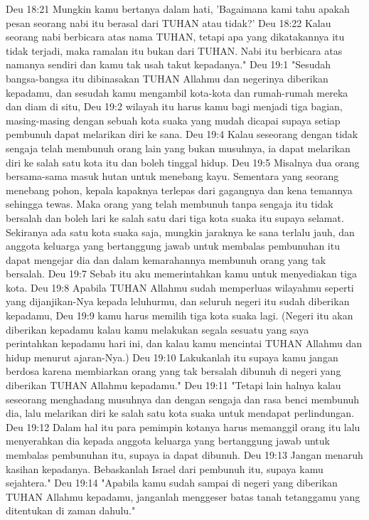 Deu 18:21  Mungkin kamu bertanya dalam hati, 'Bagaimana kami tahu apakah pesan seorang nabi itu berasal dari TUHAN atau tidak?'
Deu 18:22  Kalau seorang nabi berbicara atas nama TUHAN, tetapi apa yang dikatakannya itu tidak terjadi, maka ramalan itu bukan dari TUHAN. Nabi itu berbicara atas namanya sendiri dan kamu tak usah takut kepadanya."
Deu 19:1  "Sesudah bangsa-bangsa itu dibinasakan TUHAN Allahmu dan negerinya diberikan kepadamu, dan sesudah kamu mengambil kota-kota dan rumah-rumah mereka dan diam di situ,
Deu 19:2  wilayah itu harus kamu bagi menjadi tiga bagian, masing-masing dengan sebuah kota suaka yang mudah dicapai supaya setiap pembunuh dapat melarikan diri ke sana.
Deu 19:4  Kalau seseorang dengan tidak sengaja telah membunuh orang lain yang bukan musuhnya, ia dapat melarikan diri ke salah satu kota itu dan boleh tinggal hidup.
Deu 19:5  Misalnya dua orang bersama-sama masuk hutan untuk menebang kayu. Sementara yang seorang menebang pohon, kepala kapaknya terlepas dari gagangnya dan kena temannya sehingga tewas. Maka orang yang telah membunuh tanpa sengaja itu tidak bersalah dan boleh lari ke salah satu dari tiga kota suaka itu supaya selamat. Sekiranya ada satu kota suaka saja, mungkin jaraknya ke sana terlalu jauh, dan anggota keluarga yang bertanggung jawab untuk membalas pembunuhan itu dapat mengejar dia dan dalam kemarahannya membunuh orang yang tak bersalah.
Deu 19:7  Sebab itu aku memerintahkan kamu untuk menyediakan tiga kota.
Deu 19:8  Apabila TUHAN Allahmu sudah memperluas wilayahmu seperti yang dijanjikan-Nya kepada leluhurmu, dan seluruh negeri itu sudah diberikan kepadamu,
Deu 19:9  kamu harus memilih tiga kota suaka lagi. (Negeri itu akan diberikan kepadamu kalau kamu melakukan segala sesuatu yang saya perintahkan kepadamu hari ini, dan kalau kamu mencintai TUHAN Allahmu dan hidup menurut ajaran-Nya.)
Deu 19:10  Lakukanlah itu supaya kamu jangan berdosa karena membiarkan orang yang tak bersalah dibunuh di negeri yang diberikan TUHAN Allahmu kepadamu."
Deu 19:11  "Tetapi lain halnya kalau seseorang menghadang musuhnya dan dengan sengaja dan rasa benci membunuh dia, lalu melarikan diri ke salah satu kota suaka untuk mendapat perlindungan.
Deu 19:12  Dalam hal itu para pemimpin kotanya harus memanggil orang itu lalu menyerahkan dia kepada anggota keluarga yang bertanggung jawab untuk membalas pembunuhan itu, supaya ia dapat dibunuh.
Deu 19:13  Jangan menaruh kasihan kepadanya. Bebaskanlah Israel dari pembunuh itu, supaya kamu sejahtera."
Deu 19:14  "Apabila kamu sudah sampai di negeri yang diberikan TUHAN Allahmu kepadamu, janganlah menggeser batas tanah tetanggamu yang ditentukan di zaman dahulu."
